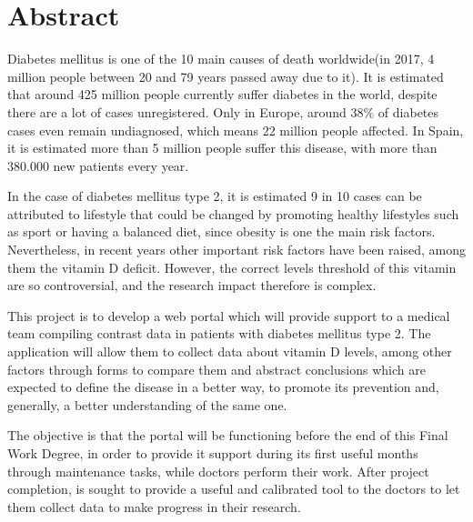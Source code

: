 \chapter*{Abstract}

Diabetes mellitus is one of the 10 main causes of death worldwide(in 2017, 4 million people between 20 and 79 years passed away due to it). It is estimated that around 425 million people currently suffer diabetes in the world, despite there are a lot of cases unregistered. Only in Europe, around 38\% of diabetes cases  even remain undiagnosed, which means 22 million people affected. In Spain, it is estimated more than 5 million people suffer this disease, with more than 380.000 new patients every year.
 \newline
 	
In the case of diabetes mellitus type 2, it is estimated 9 in 10 cases can be attributed to lifestyle that could be changed by promoting  healthy lifestyles such as sport or having a balanced diet, since obesity is one the main risk factors. Nevertheless, in recent years other important risk factors have been raised, among them the vitamin D deficit. However, the  correct levels threshold  of this vitamin are so controversial, and the research impact therefore is complex. \newline
 	
This project is to develop a web portal which will provide support to a medical team compiling contrast data in patients with diabetes mellitus type 2. The application will allow them to collect data about vitamin D levels, among other factors through forms to compare them and abstract conclusions which are expected to define the disease in a better way, to promote its prevention and, generally, a better understanding of the same one. \newline
 	  
 The objective is that the portal will be functioning before the end of this Final Work Degree, in order to provide it support during its first useful months through maintenance tasks, while doctors perform their work. After project completion, is sought to provide a useful and calibrated tool to the doctors to let them collect data to make progress in their research.
 	
 	
